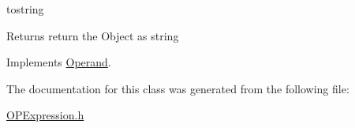 tostring \begin{DoxyReturn}{Returns}
return the Object as string 
\end{DoxyReturn}


Implements \hyperlink{classOperand_a28aed96d5fafee66be81c30c1435ad00}{Operand}.

The documentation for this class was generated from the following file:\begin{DoxyCompactItemize}
\item 
\hyperlink{OPExpression_8h}{OPExpression.h}\end{DoxyCompactItemize}
